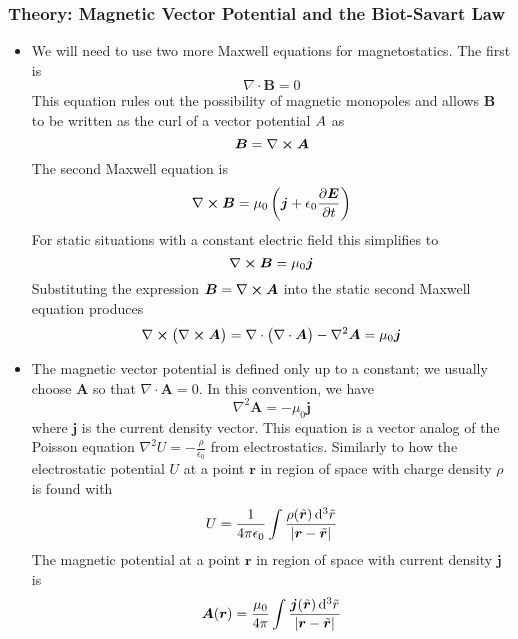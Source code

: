 \documentclass[11pt, a4paper]{article}
\newcommand{\diff}{\mathop{}\!\mathrm{d}} %
\renewcommand{\vec}[1]{\bm{#1}} %
\newcommand{\tvec}[1]{\tilde{\vec{#1}}} %
\renewcommand{\r}{\vec{r}}
\newcommand{\E}{\vec{E}} %
\newcommand{\B}{\vec{B}} %
\newcommand{\A}{\vec{A}} %
\newcommand{\e}{\epsilon_{0}}  %
\renewcommand{\div}{\nabla \cdot}
\renewcommand{\curl}{\nabla \cross}
\renewcommand{\laplacian}{\nabla^{2}}
\begin{document}
\subsubsection{Theory: Magnetic Vector Potential and the Biot-Savart Law}
\begin{itemize}
	\item We will need to use two more Maxwell equations for magnetostatics. The first is
	\begin{equation*}
		\div \B = 0
	\end{equation*}
	This equation rules out the possibility of magnetic monopoles and allows $ \B $ to be written as the curl of a vector potential $ \\A $ as
	\begin{equation*}
		\B = \curl \A
	\end{equation*}
	The second Maxwell equation is 
	\begin{equation*}
		\curl \B = \mu_{0}\left(\vec{j} + \e \pdv{\E}{t}\right)
	\end{equation*}
	For static situations with a constant electric field this simplifies to
	\begin{equation*}
		\curl \B = \mu_{0}\vec{j}
	\end{equation*}
	Substituting the expression $ \B = \curl \A $ into the static second Maxwell equation produces
	\begin{equation*}
		\curl \big(\curl \A\big) = \div \big(\div \A\big) - \laplacian \A = \mu_{0} \vec{j}
	\end{equation*}
	
	\item The magnetic vector potential is defined only up to a constant; we usually choose $ \A $ so that $ \div \A = 0 $. In this convention, we have
	\begin{equation*}
		\laplacian \A = - \mu_{0}\vec{j}
	\end{equation*}
	where $ \vec{j} $ is the current density vector. This equation is a vector analog of the Poisson equation $ \laplacian U = - \frac{\rho}{\e} $ from electrostatics. Similarly to how the electrostatic potential $ U $ at a point $ \r $ in region of space with charge density $ \rho $ is found with
	\begin{equation*}
		U = \frac{1}{4 \pi \e} \int \frac{\rho(\tvec{r})\diff^{3}\tilde{r}}{\abs{\r - \tvec{r}}}
	\end{equation*}
	The magnetic potential at a point $ \r $ in region of space with current density $ \vec{j} $ is
	\begin{equation*}
		\A(\r) = \frac{\mu_{0}}{4 \pi} \int \frac{\vec{j}(\tvec{r})\diff^{3}\tilde{r}}{\abs{\r - \tvec{r}}}
	\end{equation*}
	

\end{itemize}
\end{document}
